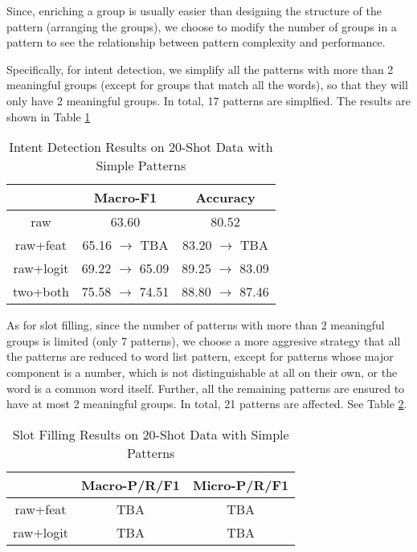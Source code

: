 Since, enriching a group is usually easier than designing the structure of the pattern (arranging the groups), we choose to modify the number of groups in a pattern to see the relationship between pattern complexity and performance.

Specifically, for intent detection, we simplify all the patterns with more than 2 meaningful groups (except for groups that match all the words), so that they will only have 2 meaningful groups. In total, 17 patterns are simplfied. The results are shown in Table \ref{simple_intent}

\begin{table}
\setlength{\tabcolsep}{0.23em}
\centering
\small{
\begin{tabular}{|c|c|c|}

\hline
  & Macro-F1 & Accuracy  \\
\hline
raw & 63.60 & 80.52 \\
\hline
raw+feat & 65.16 $\rightarrow$ TBA & 83.20 $\rightarrow$ TBA \\
\hline
raw+logit & 69.22 $\rightarrow$ 65.09 & 89.25 $\rightarrow$ 83.09  \\
\hline
two+both & 75.58 $\rightarrow$ 74.51 & 88.80 $\rightarrow$ 87.46 \\
\hline 
\end{tabular}
}
\caption{Intent Detection Results on 20-Shot Data with Simple Patterns}
\label{simple_intent}
\end{table}


As for slot filling, since the number of patterns with more than 2 meaningful groups is limited (only 7 patterns), we choose a more aggresive strategy that all the patterns are reduced to word list pattern, except for patterns whose major component is a number, which is not distinguishable at all on their own, or the word is a common word itself. Further, all the remaining patterns are ensured to have at most 2 meaningful groups. In total, 21 patterns are affected. See Table \ref{simple_slot}.

\begin{table}
\setlength{\tabcolsep}{0.23em}
\centering
\small{
\begin{tabular}{|c|c|c|}

\hline
  & Macro-P/R/F1 & Micro-P/R/F1  \\
\hline
raw+feat & TBA & TBA  \\
\hline
raw+logit & TBA & TBA  \\
\hline 
\end{tabular}
}
\caption{Slot Filling Results on 20-Shot Data with Simple Patterns}
\label{simple_slot}
\end{table}




